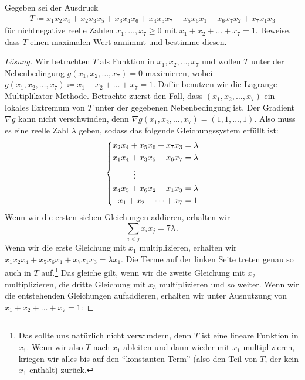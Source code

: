 \begin{aufgabe*}
	Gegeben sei der Ausdruck
	\begin{align*}
		T\coloneqq x_1x_2x_4+x_2x_3x_5+x_3x_4x_6+x_4x_5x_7+x_5x_6x_1+x_6x_7x_2+x_7x_1x_3
	\end{align*}
	für nichtnegative reelle Zahlen $x_1,\ldots,x_7\geqslant 0$ mit $x_1+x_2+\ldots+x_7=1$. Beweise, dass $T$ einen maximalen Wert annimmt und bestimme diesen.
\end{aufgabe*}
\begin{proof}[Lösung]
	Wir betrachten $T$ als Funktion in $x_1,x_2,\dotsc,x_7$ und wollen $T$ unter der Nebenbedingung $g(x_1,x_2,\dotsc,x_7)=0$ maximieren, wobei $g(x_1,x_2,\dotsc,x_7)\coloneqq x_1+x_2+\ldots+x_7=1$. Dafür benutzen wir die Lagrange-Multiplikator-Methode. Betrachte zuerst den Fall, dass $(x_1,x_2,\dotsc,x_7)$ ein lokales Extremum von $T$ unter der gegebenen Nebenbedingung ist. Der Gradient $\nabla g$ kann nicht verschwinden, denn $\nabla g(x_1,x_2,\dotsc,x_7)=(1,1,\dotsc,1)$. Also muss es eine reelle Zahl $\lambda$ geben, sodass das folgende Gleichungssystem erfüllt ist:
	\begin{equation*}
		\left\{\begin{alignedat}{3}
			x_2x_4&+x_5x_6&&+x_7x_3&&=\lambda\\
			x_1x_4&+x_3x_5&&+x_6x_7&&=\lambda\\
			&\mathrel{\tikz[inner sep=0,outer sep=0]{\node at (0,-0.5ex) {$\phantom{=}$};\node at (0,0) {$\vdots$};}}\\
			x_4x_5&+x_6x_2&&+x_1x_3&&=\lambda\\
			&&&&\llap{$x_1+x_2+\dotsb+x_7$}&=1
		\end{alignedat}\right.
	\end{equation*}
	Wenn wir die ersten sieben Gleichungen addieren, erhalten wir
	\begin{equation*}
		\sum_{i<j}x_ix_j=7\lambda\,.
	\end{equation*}
	Wenn wir die erste Gleichung mit $x_1$ multiplizieren, erhalten wir $x_1x_2x_4+x_5x_6x_1+x_7x_1x_3=\lambda x_1$. Die Terme auf der linken Seite treten genau so auch in $T$ auf.\footnote{Das sollte uns natürlich nicht verwundern, denn $T$ ist eine lineare Funktion in $x_1$. Wenn wir also $T$ nach $x_1$ ableiten und dann wieder mit $x_1$ multiplizieren, kriegen wir alles bis auf den \enquote{konstanten Term} (also den Teil von $T$, der kein $x_1$ enthält) zurück.} Das gleiche gilt, wenn wir die zweite Gleichung mit $x_2$ multiplizieren, die dritte Gleichung mit $x_3$ multiplizieren und so weiter. Wenn wir die entstehenden Gleichungen aufaddieren, erhalten wir unter Ausnutzung von $x_1+x_2+\dotsc+x_7=1$:

\end{proof}
